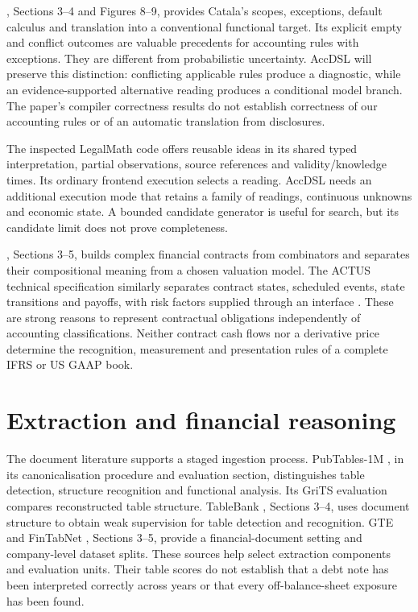 \citet{merigoux2021}, Sections 3--4 and Figures 8--9, provides Catala's scopes,
exceptions, default calculus and translation into a conventional functional
target. Its explicit empty and conflict outcomes are valuable precedents for
accounting rules with exceptions. They are different from probabilistic
uncertainty. AccDSL will preserve this distinction: conflicting applicable
rules produce a diagnostic, while an evidence-supported alternative reading
produces a conditional model branch. The paper's compiler correctness results
do not establish correctness of our accounting rules or of an automatic
translation from disclosures.

The inspected LegalMath code offers reusable ideas in its shared typed
interpretation, partial observations, source references and validity/knowledge
times. Its ordinary frontend execution selects a reading. AccDSL needs an
additional execution mode that retains a family of readings, continuous
unknowns and economic state. A bounded candidate generator is useful for
search, but its candidate limit does not prove completeness.

\citet{jones2000}, Sections 3--5, builds complex financial contracts from
combinators and separates their compositional meaning from a chosen valuation
model. The ACTUS technical specification similarly separates contract states,
scheduled events, state transitions and payoffs, with risk factors supplied
through an interface \citep{actus}. These are strong reasons to represent
contractual obligations independently of accounting classifications. Neither
contract cash flows nor a derivative price determine the recognition,
measurement and presentation rules of a complete IFRS or US GAAP book.

\section{Extraction and financial reasoning}

The document literature supports a staged ingestion process. PubTables-1M
\citep{smock2022}, in its canonicalisation procedure and evaluation section,
distinguishes table detection, structure recognition and functional analysis.
Its GriTS evaluation compares reconstructed table structure. TableBank
\citep{li2020}, Sections 3--4, uses document structure to obtain weak supervision
for table detection and recognition. GTE and FinTabNet \citep{zheng2021},
Sections 3--5, provide a financial-document setting and company-level dataset
splits. These sources help select extraction components and evaluation units.
Their table scores do not establish that a debt note has been interpreted
correctly across years or that every off-balance-sheet exposure has been found.

